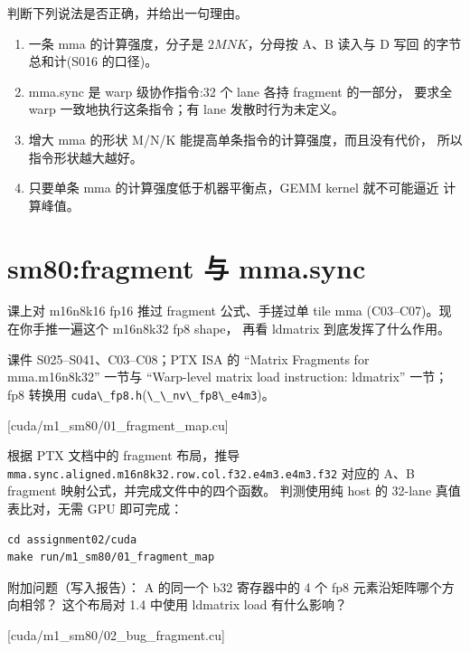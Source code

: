 \documentclass[11pt,a4paper,fontset=none]{ctexart}
\providecommand{\passthrough}[1]{#1}
\begin{document}

判断下列说法是否正确，并给出一句理由。

\begin{enumerate}
\def\labelenumi{(\alph{enumi})}
\item
  一条 mma 的计算强度，分子是 \(2MNK\)，分母按 A、B 读入与 D 写回
  的字节总和计(S016 的口径)。
\item
  mma.sync 是 warp 级协作指令:32 个 lane 各持 fragment 的一部分， 要求全
  warp 一致地执行这条指令；有 lane 发散时行为未定义。
\item
  增大 mma 的形状 M/N/K 能提高单条指令的计算强度，而且没有代价，
  所以指令形状越大越好。
\item
  只要单条 mma 的计算强度低于机器平衡点，GEMM kernel 就不可能逼近
  计算峰值。
\end{enumerate}

\section{sm80:fragment 与 mma.sync}\label{sm80fragment-ux4e0e-mma.sync}

课上对 m16n8k16 fp16 推过 fragment 公式、手搓过单 tile mma
(C03--C07)。现在你手推一遍这个 m16n8k32 fp8 shape， 再看 ldmatrix
到底发挥了什么作用。

\begin{reading}

课件 S025--S041、C03--C08；PTX ISA 的 ``Matrix Fragments for
mma.m16n8k32'' 一节与 ``Warp-level matrix load instruction: ldmatrix''
一节；fp8 转换用
\passthrough{\lstinline!cuda\_fp8.h!}(\passthrough{\lstinline!\_\_nv\_fp8\_e4m3!})。

\end{reading}

[cuda/m1\_sm80/01\_fragment\_map.cu]

根据 PTX 文档中的 fragment 布局，推导
\passthrough{\lstinline!mma.sync.aligned.m16n8k32.row.col.f32.e4m3.e4m3.f32!}
对应的 A、B fragment 映射公式，并完成文件中的四个函数。 判测使用纯 host
的 32-lane 真值表比对，无需 GPU 即可完成：

\begin{lstlisting}
cd assignment02/cuda
make run/m1_sm80/01_fragment_map
\end{lstlisting}

附加问题（写入报告）： A 的同一个 b32 寄存器中的 4 个 fp8
元素沿矩阵哪个方向相邻？ 这个布局对 1.4 中使用 ldmatrix load
有什么影响？

[cuda/m1\_sm80/02\_bug\_fragment.cu]
\end{document}
